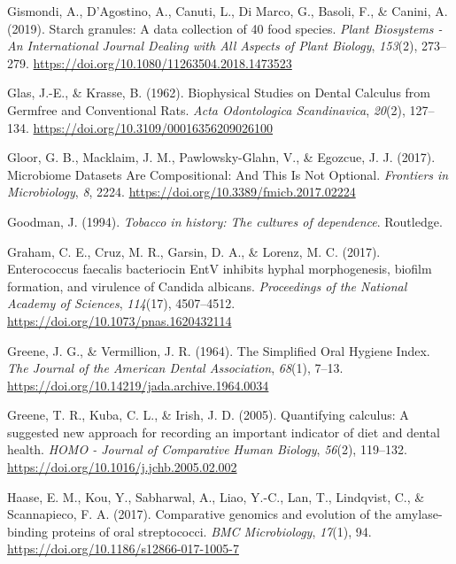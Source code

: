\documentclass[
  letterpaper,
]{book}
\newlength{\cslhangindent}
\newlength{\cslentryspacingunit} %
\newenvironment{CSLReferences}[2] %
 {%
  \setlength{\parindent}{0pt}
  \ifodd #1
  \let\oldpar\par
  \def\par{\hangindent=\cslhangindent\oldpar}
  \fi
  \setlength{\parskip}{#2\cslentryspacingunit}
 }%
 {}
\begin{document}
\begin{CSLReferences}{1}{0}
\leavevmode{}%
Gismondi, A., D'Agostino, A., Canuti, L., Di Marco, G., Basoli, F., \&
Canini, A. (2019). Starch granules: A data collection of 40 food
species. \emph{Plant Biosystems - An International Journal Dealing with
All Aspects of Plant Biology}, \emph{153}(2), 273--279.
\url{https://doi.org/10.1080/11263504.2018.1473523}

\leavevmode{}%
Glas, J.-E., \& Krasse, B. (1962). Biophysical {Studies} on {Dental
Calculus} from {Germfree} and {Conventional Rats}. \emph{Acta
Odontologica Scandinavica}, \emph{20}(2), 127--134.
\url{https://doi.org/10.3109/00016356209026100}

\leavevmode{}%
Gloor, G. B., Macklaim, J. M., Pawlowsky-Glahn, V., \& Egozcue, J. J.
(2017). Microbiome {Datasets Are Compositional}: {And This Is Not
Optional}. \emph{Frontiers in Microbiology}, \emph{8}, 2224.
\url{https://doi.org/10.3389/fmicb.2017.02224}

\leavevmode{}%
Goodman, J. (1994). \emph{Tobacco in history: The cultures of
dependence}. {Routledge}.

\leavevmode{}%
Graham, C. E., Cruz, M. R., Garsin, D. A., \& Lorenz, M. C. (2017).
Enterococcus faecalis bacteriocin {EntV} inhibits hyphal morphogenesis,
biofilm formation, and virulence of {Candida} albicans.
\emph{Proceedings of the National Academy of Sciences}, \emph{114}(17),
4507--4512. \url{https://doi.org/10.1073/pnas.1620432114}

\leavevmode{}%
Greene, J. G., \& Vermillion, J. R. (1964). The {Simplified Oral Hygiene
Index}. \emph{The Journal of the American Dental Association},
\emph{68}(1), 7--13.
\url{https://doi.org/10.14219/jada.archive.1964.0034}

\leavevmode{}%
Greene, T. R., Kuba, C. L., \& Irish, J. D. (2005). Quantifying
calculus: {A} suggested new approach for recording an important
indicator of diet and dental health. \emph{HOMO - Journal of Comparative
Human Biology}, \emph{56}(2), 119--132.
\url{https://doi.org/10.1016/j.jchb.2005.02.002}

\leavevmode{}%
Haase, E. M., Kou, Y., Sabharwal, A., Liao, Y.-C., Lan, T., Lindqvist,
C., \& Scannapieco, F. A. (2017). Comparative genomics and evolution of
the amylase-binding proteins of oral streptococci. \emph{BMC
Microbiology}, \emph{17}(1), 94.
\url{https://doi.org/10.1186/s12866-017-1005-7}


\end{CSLReferences}
\end{document}
